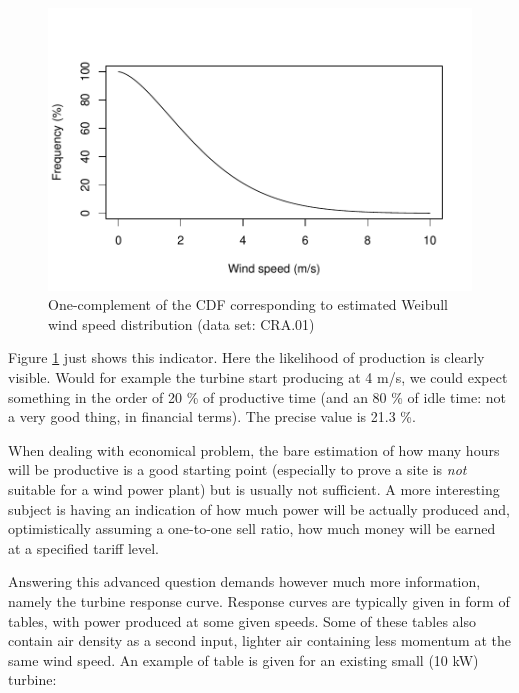 \documentclass[a4paper,10pt]{book}
\begin{document}
\begin{figure}[htp]
 \centering
 \begin{center}
 \includegraphics[scale=0.80,keepaspectratio=true]{./diagrams/Weibull_Exceedance_Probability.pdf}
 \end{center}
 \caption{One-complement of the CDF corresponding to estimated Weibull wind speed distribution (data set: CRA.01)}
 \label{fig:CRA01 Weibull Exceedance}
\end{figure}

Figure \ref{fig:CRA01 Weibull Exceedance}  just shows this indicator. Here the likelihood of production is clearly visible. Would for example the turbine start producing at 4 m/s, we could expect something in the order of 20 \% of productive time (and an 80 \% of idle time: not a very good thing, in financial terms). The precise value is 21.3 \%.

When dealing with economical problem, the bare estimation of how many hours will be productive is a good starting point (especially to prove a site is \emph{not} suitable for a wind power plant) but is usually not sufficient. A more interesting subject is having an indication of how much power will be actually produced and, optimistically assuming a one-to-one sell ratio, how much money will be earned at a specified tariff level.

Answering this advanced question demands however much more information, namely the turbine response curve. Response curves are typically given in form of tables, with power produced at some given speeds. Some of these tables also contain air density as a second input, lighter air containing less momentum at the same wind speed. An example of table is given for an existing small (10 kW) turbine:
\end{document}
